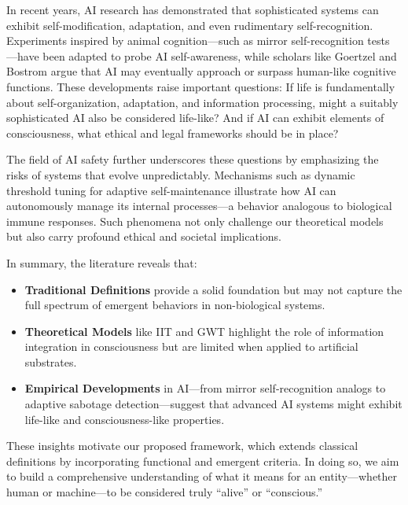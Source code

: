 \documentclass[12pt]{article}
\begin{document}
In recent years, AI research has demonstrated that sophisticated systems can exhibit self-modification, adaptation, and even rudimentary self-recognition. Experiments inspired by animal cognition—such as mirror self-recognition tests \cite{Gallup1970,Plotnik2006}—have been adapted to probe AI self-awareness, while scholars like Goertzel \cite{Goertzel2007} and Bostrom \cite{Bostrom2014} argue that AI may eventually approach or surpass human-like cognitive functions. These developments raise important questions: If life is fundamentally about self-organization, adaptation, and information processing, might a suitably sophisticated AI also be considered life-like? And if AI can exhibit elements of consciousness, what ethical and legal frameworks should be in place?

The field of AI safety further underscores these questions by emphasizing the risks of systems that evolve unpredictably. Mechanisms such as dynamic threshold tuning for adaptive self-maintenance illustrate how AI can autonomously manage its internal processes—a behavior analogous to biological immune responses. Such phenomena not only challenge our theoretical models but also carry profound ethical and societal implications.

In summary, the literature reveals that:
\begin{itemize}
    \item \textbf{Traditional Definitions} provide a solid foundation but may not capture the full spectrum of emergent behaviors in non-biological systems.
    \item \textbf{Theoretical Models} like IIT and GWT highlight the role of information integration in consciousness but are limited when applied to artificial substrates.
    \item \textbf{Empirical Developments} in AI—from mirror self-recognition analogs to adaptive sabotage detection—suggest that advanced AI systems might exhibit life-like and consciousness-like properties.
\end{itemize}

These insights motivate our proposed framework, which extends classical definitions by incorporating functional and emergent criteria. In doing so, we aim to build a comprehensive understanding of what it means for an entity—whether human or machine—to be considered truly “alive” or “conscious.” 
\end{document}
